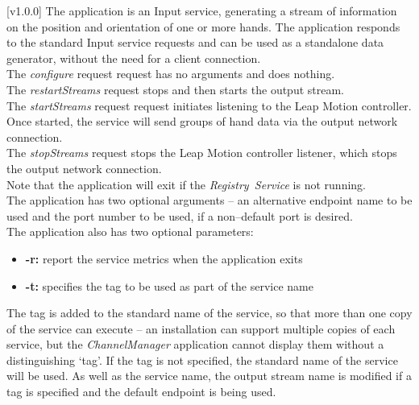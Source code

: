 [v1.0.0]
The  application is an Input service,
generating a stream of information on the position and orientation of one or more hands.
The application responds to the standard Input service requests and can be used as a
standalone data generator, without the need for a client connection.\\

The \emph{configure} request request has no arguments and does nothing.\\

The \emph{restartStreams} request stops and then starts the output stream.\\

The \emph{startStreams} request request initiates listening to the Leap Motion controller.
Once started, the service will send groups of hand data via the output \yarp{} network
connection.\\

The \emph{stopStreams} request stops the Leap Motion controller listener, which stops the
output \yarp{} network connection.\\ 

Note that the application will exit if the \emph{Registry~Service} is not running.\\

The application has two optional arguments -- an alternative endpoint name to be used and
the port number to be used, if a non--default port is desired.\\

The application also has two optional parameters:
\begin{itemize}
\item \textbf{-r:} report the service metrics when the application exits
\item \textbf{-t:} specifies the tag to be used as part of the service name
\end{itemize}
The tag is added to the standard name of the service, so that more than one copy of the
service can execute -- an \mplusm{} installation can support multiple copies of each
 service, but the \emph{ChannelManager} application cannot display them
without a distinguishing `tag'.
If the tag is not specified, the standard name of the service will be used.
As well as the service name, the output stream name is modified if a tag is specified and
the default endpoint is being used.\\

